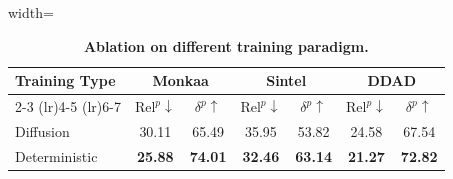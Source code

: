 \begin{table}[h]
\centering
\caption{
\textbf{Ablation on different training paradigm.}
}
\label{tab:diffusion_vs_determ}
\begin{adjustbox}{width=\linewidth}
\begin{tabular}{@{}l cc cc cc@{}}
\toprule
\multirow{2}{*}{\textbf{Training Type}} & 
\multicolumn{2}{c}{\textbf{Monkaa}} &
\multicolumn{2}{c}{\textbf{Sintel}} &
\multicolumn{2}{c}{\textbf{DDAD}} \\
\cmidrule(lr){2-3} \cmidrule(lr){4-5} \cmidrule(lr){6-7}
& 
$\text{Rel}^{p}\!\downarrow$ & $\delta^{p}\!\uparrow$ &
$\text{Rel}^{p}\!\downarrow$ & $\delta^{p}\!\uparrow$ &
$\text{Rel}^{p}\!\downarrow$ & $\delta^{p}\!\uparrow$ \\
\midrule
Diffusion &  {30.11} & {65.49} & {35.95} & {53.82} & 24.58 & 67.54 \\
Deterministic &  \textbf{25.88} & \textbf{74.01} & \textbf{32.46} & \textbf{63.14} & \textbf{21.27} & \textbf{72.82} \\
\bottomrule
\end{tabular}
\end{adjustbox}
\end{table}